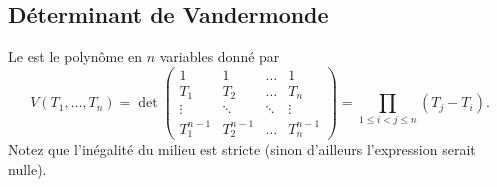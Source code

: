 \subsection{Déterminant de Vandermonde}

\begin{proposition}  \label{PropnuUvtj}
    Le  est le polynôme en \( n\) variables donné par
    \begin{equation}
        V(T_1,\ldots, T_n)=\det\begin{pmatrix}
             1   &   1    &   \ldots    &   1    \\
             T_1   &   T_2    &   \ldots    &   T_n    \\
             \vdots   &   \ddots    &   \ddots    &   \vdots    \\
             T_1^{n-1}   &   T_2^{n-1}    &   \ldots    &   T_n^{n-1}
         \end{pmatrix}=\prod_{1\leq i<j\leq n}(T_j-T_i).
    \end{equation}
    Notez que l'inégalité du milieu est stricte (sinon d'ailleurs l'expression serait nulle).
\end{proposition}

